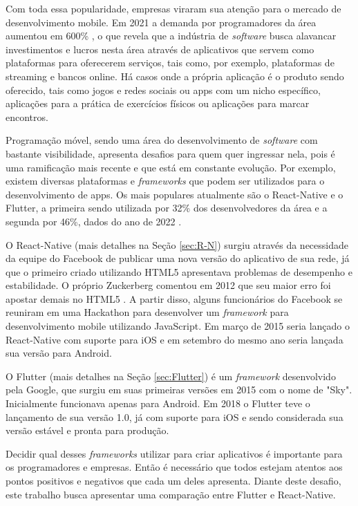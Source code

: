 \documentclass[12pt]{article}
\begin{document}
Com toda essa popularidade, empresas viraram sua atenção para o mercado de desenvolvimento mobile. Em 2021 a demanda por programadores da área aumentou em 600\% \cite{ref_3}, o que revela que a indústria de \textit{software} busca alavancar investimentos e lucros nesta área através de aplicativos que servem como plataformas para oferecerem serviços, tais como, por exemplo, plataformas de streaming e bancos online. Há casos onde a própria aplicação é o produto sendo oferecido, tais como jogos e redes sociais ou apps com um nicho específico, aplicações para a prática de exercícios físicos ou aplicações para marcar encontros. 

Programação móvel, sendo uma área do desenvolvimento de \textit{software} com bastante visibilidade, apresenta desafios para quem quer ingressar nela, pois é uma ramificação mais recente e que está em constante evolução. Por exemplo, existem diversas plataformas e \textit{frameworks} que podem ser utilizados para o desenvolvimento de apps. Os mais populares atualmente são o React-Native e o Flutter, a primeira sendo utilizada por 32\% dos desenvolvedores da área e a segunda por 46\%, dados do ano de 2022 \cite{ref_1}. 

O React-Native (mais detalhes na Seção \ref{sec:R-N}) surgiu através da necessidade da equipe do Facebook de publicar uma nova versão do aplicativo de sua rede, já que o primeiro criado utilizando HTML5 apresentava problemas de desempenho e estabilidade. O próprio Zuckerberg comentou em 2012 que seu maior erro foi apostar demais no HTML5 \cite{ref_5}. A partir disso, alguns funcionários do Facebook se reuniram em uma Hackathon para desenvolver um \textit{framework} para desenvolvimento mobile utilizando JavaScript. Em março de 2015 seria lançado o React-Native com suporte para iOS e em setembro do mesmo ano seria lançada sua versão para Android. 

O Flutter (mais detalhes na Seção \ref{sec:Flutter})  é um \textit{framework} desenvolvido pela Google, que surgiu em suas primeiras versões em 2015 com o nome de "Sky". Inicialmente funcionava apenas para Android. Em 2018 o Flutter teve o lançamento de sua versão 1.0, já com suporte para iOS e sendo considerada sua versão estável e pronta para produção.
 
Decidir qual desses \textit{frameworks} utilizar para criar aplicativos é importante para os programadores e empresas. Então é necessário que todos estejam atentos aos pontos positivos e negativos que cada um deles apresenta. Diante deste desafio, este trabalho busca apresentar uma comparação entre Flutter e React-Native. 
 
\end{document}
